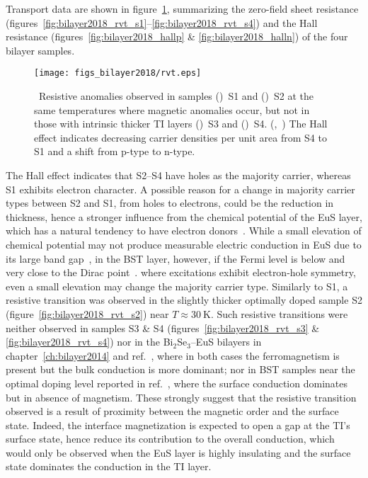 Transport data are shown in figure~\ref{fig:bilayer2018_rvt}, summarizing the zero-field sheet resistance (figures~\ref{fig:bilayer2018_rvt_s1}--\ref{fig:bilayer2018_rvt_s4}) and the Hall resistance (figures~\ref{fig:bilayer2018_hallp} \& \ref{fig:bilayer2018_halln}) of the four bilayer samples. %
\begin{figure}[ht]%
    \centering%
    \texttt{[image: figs\_bilayer2018/rvt.eps]}%
    \subfloat{\label{fig:bilayer2018_rvt_s1}}%
    \subfloat{\label{fig:bilayer2018_rvt_s2}}%
    \subfloat{\label{fig:bilayer2018_rvt_s3}}%
    \subfloat{\label{fig:bilayer2018_rvt_s4}}%
    \subfloat{\label{fig:bilayer2018_hallp}}%
    \subfloat{\label{fig:bilayer2018_halln}}%
    \caption[Temperature dependence of resistance and Hall effects in (Bi$_{x}$Sb$_{1-x}$)$_2$Te$_3$--EuS bilayer samples]{\label{fig:bilayer2018_rvt}~Resistive anomalies observed in samples (\protect{})~S1 and (\protect{})~S2 at the same temperatures where magnetic anomalies occur, but not in those with intrinsic thicker TI layers (\protect{})~S3 and (\protect{})~S4. (\protect{},~\protect{}) The Hall effect indicates decreasing carrier densities per unit area from S4 to S1 and a shift from p-type to n-type.}%
\end{figure}%
The Hall effect indicates that S2--S4 have holes as the majority carrier, whereas S1 exhibits electron character. A possible reason for a change in majority carrier types between S2 and S1, from holes to electrons, could be the reduction in thickness, hence a stronger influence from the chemical potential of the EuS layer, which has a natural tendency to have electron donors~\cite{EuS_ntype}. While a small elevation of chemical potential may not produce measurable electric conduction in EuS due to its large band gap~\cite{EuS_band_th1, EuS_band_th2}, in the BST layer, however, if the Fermi level is below and very close to the Dirac point~\cite{ZhangJS2011}. where excitations exhibit electron-hole symmetry, even a small elevation may change the majority carrier type. Similarly to S1, a resistive transition was observed in the slightly thicker optimally doped sample S2 (figure~\ref{fig:bilayer2018_rvt_s2}) near $T\approx30~\mathrm{K}$. Such resistive transitions were neither observed in samples S3 \& S4 (figures~\ref{fig:bilayer2018_rvt_s3} \& \ref{fig:bilayer2018_rvt_s4}) nor in the Bi$_2$Se$_3$--EuS bilayers in chapter~\ref{ch:bilayer2014} and ref.~\cite{bilayer2014}, where in both cases the ferromagnetism is present but the bulk conduction is more dominant; nor in BST samples near the optimal doping level reported in ref.~\cite{ZhangJS2011}, where the surface conduction dominates but in absence of magnetism. These strongly suggest that the resistive transition observed is a result of proximity between the magnetic order and the surface state. Indeed, the interface magnetization is expected to open a gap at the TI's surface state, hence reduce its contribution to the overall conduction, which would only be observed when the EuS layer is highly insulating and the surface state dominates the conduction in the TI layer.

